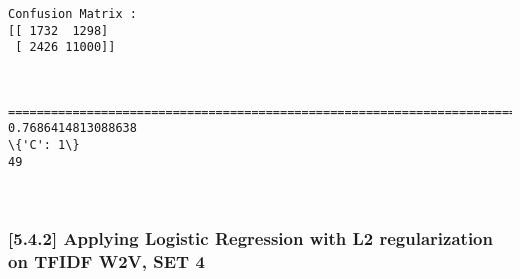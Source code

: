 \documentclass[11pt]{article}
\begin{document}
    \begin{Verbatim}[commandchars=\\\{\}]
Confusion Matrix : 
[[ 1732  1298]
 [ 2426 11000]]

    \end{Verbatim}

    \begin{center}
    \end{center}
    { \hspace*{\fill} \\}
    
    \begin{Verbatim}[commandchars=\\\{\}]
====================================================================================================
0.7686414813088638
\{'C': 1\}
49

    \end{Verbatim}

    \begin{center}
    \end{center}
    { \hspace*{\fill} \\}
    
    \subsubsection{{[}5.4.2{]} Applying Logistic Regression with L2
regularization on TFIDF W2V, SET
4}\label{applying-logistic-regression-with-l2-regularization-on-tfidf-w2v-set-4}
\end{document}
